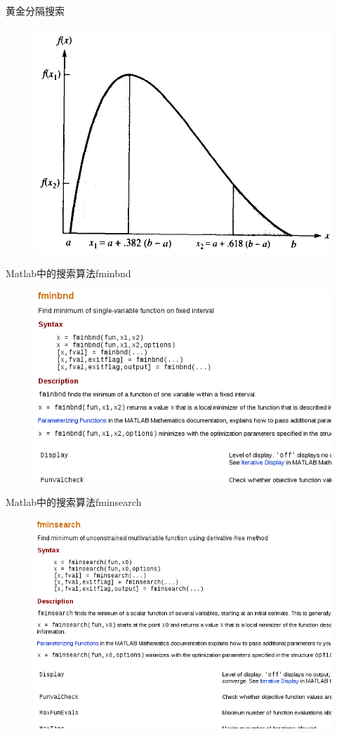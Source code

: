 \documentclass[mathserif, table]{beamer}
\begin{document}
\begin{frame}{黄金分隔搜索}
  \begin{figure}
    \includegraphics[height=.8\textheight{}]{gold.png}
  \end{figure}    
\end{frame}

\begin{frame}{Matlab中的搜索算法fminbnd}
  \begin{figure}
    \includegraphics[height=.8\textheight{}]{fminbnd.png}
  \end{figure}      
\end{frame}

\begin{frame}{Matlab中的搜索算法fminsearch}
  \begin{figure}
    \includegraphics[height=.8\textheight{}]{fminsearch.png}
  \end{figure}      
\end{frame}
\end{document}
